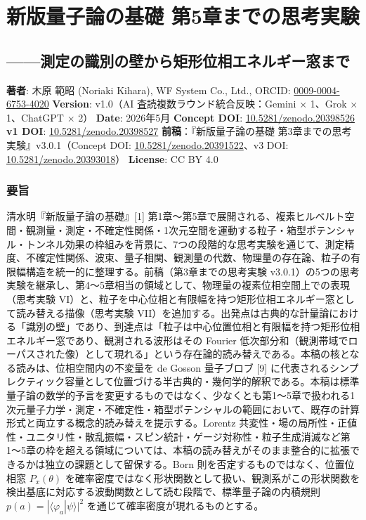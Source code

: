 \documentclass[
]{ltjsarticle}
\author{}
\date{}
\begin{document}
\section{新版量子論の基礎
第5章までの思考実験}\label{ux65b0ux7248ux91cfux5b50ux8ad6ux306eux57faux790e-ux7b2c5ux7ae0ux307eux3067ux306eux601dux8003ux5b9fux9a13}

\subsection{------測定の識別の壁から矩形位相エネルギー窓まで}\label{ux6e2cux5b9aux306eux8b58ux5225ux306eux58c1ux304bux3089ux77e9ux5f62ux4f4dux76f8ux30a8ux30cdux30ebux30aeux30fcux7a93ux307eux3067}

\textbf{著者}: 木原 範昭 (Noriaki Kihara), WF System Co., Ltd., ORCID:
\href{https://orcid.org/0009-0004-6753-4020}{0009-0004-6753-4020}
\textbf{Version}: v1.0（AI 査読複数ラウンド統合反映：Gemini × 1、Grok ×
1、ChatGPT × 2） \textbf{Date}: 2026年5月 \textbf{Concept DOI}:
\href{https://doi.org/10.5281/zenodo.20398526}{10.5281/zenodo.20398526}
\textbf{v1 DOI}:
\href{https://doi.org/10.5281/zenodo.20398527}{10.5281/zenodo.20398527}
\textbf{前稿}：『新版量子論の基礎 第3章までの思考実験』v3.0.1（Concept
DOI:
\href{https://doi.org/10.5281/zenodo.20391522}{10.5281/zenodo.20391522}、v3
DOI:
\href{https://doi.org/10.5281/zenodo.20393018}{10.5281/zenodo.20393018}）
\textbf{License}: CC BY 4.0

\subsubsection{要旨}\label{ux8981ux65e8}

清水明『新版量子論の基礎』{[}1{]}
第1章〜第5章で展開される、複素ヒルベルト空間・観測量・測定・不確定性関係・1次元空間を運動する粒子・箱型ポテンシャル・トンネル効果の枠組みを背景に、7つの段階的な思考実験を通じて、測定精度、不確定性関係、波束、量子相関、観測量の代数、物理量の存在論、粒子の有限幅構造を統一的に整理する。前稿（第3章までの思考実験
v3.0.1）の5つの思考実験を継承し、第4〜5章相当の領域として、物理量の複素位相空間上での表現（思考実験
VI）と、粒子を中心位相と有限幅を持つ矩形位相エネルギー窓として読み替える描像（思考実験
VII）を追加する。出発点は古典的な計量論における「識別の壁」であり、到達点は「粒子は中心位置位相と有限幅を持つ矩形位相エネルギー窓であり、観測される波形はその
Fourier
低次部分和（観測帯域でローパスされた像）として現れる」という存在論的読み替えである。本稿の核となる読みは、位相空間内の不変量を
de Gosson 量子ブロブ {[}9{]}
に代表されるシンプレクティック容量として位置づける半古典的・幾何学的解釈である。本稿は標準量子論の数学的予言を変更するものではなく、少なくとも第1〜5章で扱われる1次元量子力学・測定・不確定性・箱型ポテンシャルの範囲において、既存の計算形式と両立する概念的読み替えを提示する。Lorentz
共変性・場の局所性・正値性・ユニタリ性・散乱振幅・スピン統計・ゲージ対称性・粒子生成消滅など第1〜5章の枠を超える領域については、本稿の読み替えがそのまま整合的に拡張できるかは独立の課題として留保する。Born
則を否定するものではなく、位置位相窓 \(P_x(\theta)\)
を確率密度ではなく形状関数として扱い、観測系がこの形状関数を検出基底に対応する波動関数として読む段階で、標準量子論の内積規則
\(p(a) = |\langle \varphi_a | \psi \rangle|^2\)
を通じて確率密度が現れるものとする。
\end{document}

